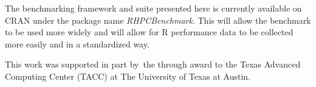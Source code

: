 The benchmarking framework and suite presented here is currently available on 
CRAN under the package name \textit{RHPCBenchmark}. This will allow the benchmark
to be used more widely and will allow for R performance data to be collected more easily
and in a standardized way.

\begin{acks}
This work was supported in part by the 
through award  to the Texas Advanced
Computing Center (TACC) at The University of Texas at Austin.
\end{acks}



